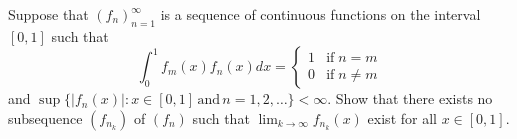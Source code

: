 Suppose that \((f_{n})_{n=1}^{\infty}\) is a sequence of continuous functions on the interval \([0,1]\) such that
\[\int_{0}^{1}f_{m}(x)f_{n}(x) dx=
\begin{cases} 
1& \text{if}\;n=m\\
 0 & \text{if} \;n\ne m
\end{cases}\]and \(\sup\{|f_{n}(x)|: x\in [0,1]\, \text{and}\, n=1,2,\dots\}< \infty\).
Show that there exists no subsequence \((f_{n_{k}})\) of \((f_{n})\) such that \(\lim_{k\to \infty}f_{n_{k}}(x)\) exist
for all \(x\in [0,1]\).
